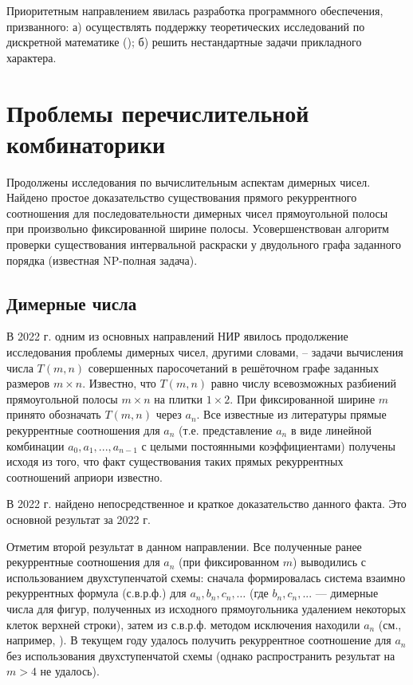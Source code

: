 Приоритетным направлением явилась разработка программного обеспечения, призванного: а) осуществлять поддержку теоретических исследований по дискретной математике (\cite{akm-bib-m9, akm-bib-m10, akm-bib-m14, akm-bib-m15}); б) решить нестандартные задачи прикладного характера.


\section{Проблемы перечислительной комбинаторики}

Продолжены исследования по вычислительным аспектам димерных чисел. Найдено простое доказательство существования прямого рекуррентного соотношения для последовательности димерных чисел прямоугольной полосы при произвольно фиксированной ширине полосы. Усовершенствован алгоритм проверки существования интервальной раскраски у двудольного графа заданного порядка (известная NP-полная задача).


\subsection{Димерные числа}

В 2022 г. одним из основных направлений НИР явилось продолжение исследования проблемы димерных чисел, другими словами, -- задачи вычисления числа $T(m,n)$ совершенных паросочетаний в решёточном графе заданных размеров $m\times n$. Известно, что $T(m,n)$ равно числу всевозможных разбиений прямоугольной полосы $m\times n$ на плитки $1\times 2$. При фиксированной ширине $m$ принято обозначать $T(m,n)$ через $a_n$. Все известные из литературы прямые рекуррентные соотношения для $a_n$ (т.е. представление $a_n$ в виде линейной комбинации $a_0, a_1,..., a_{n-1}$ с целыми постоянными коэффициентами) получены исходя из того, что факт существования таких прямых рекуррентных соотношений априори известно.

В 2022 г. найдено непосредственное и краткое доказательство данного факта. Это основной результат за 2022 г.

Отметим второй результат в данном направлении. Все полученные ранее рекуррентные соотношения для
$a_n$ (при фиксированном $m$) выводились с использованием двухступенчатой схемы: сначала формировалась система взаимно рекуррентных формула (с.в.р.ф.) для $a_n, b_n, c_n, \dots$ (где $b_n, c_n, ...$  --- димерные числа для фигур, полученных из исходного прямоугольника удалением некоторых клеток верхней строки), затем из с.в.р.ф. методом исключения находили $a_n$ (см., например, \cite{akm-bib-m3}). В текущем году удалось получить рекуррентное соотношение для $a_n$ без использования двухступенчатой схемы (однако распространить результат на $m>4$ не удалось).

